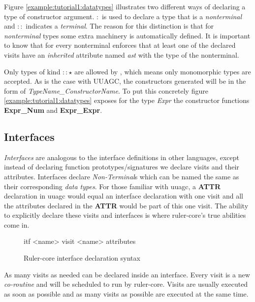 Figure \ref{example:tutorial1:datatypes} illustrates two different ways of declaring a type of constructor argument. $:$ is used to declare a type that is a \emph{nonterminal} and $::$ indicates a \emph{terminal}. The reason for this distinction is that for \emph{nonterminal} types some extra machinery is automatically defined. It is important to know that for every nonterminal \rcore enforces that at least one of the declared visits have an \emph{inherited} attribute named \emph{ast} with the type of the nonterminal.

Only types of kind $:: \star$ are allowed by \rcore, which means only monomorphic types are accepted. As is the case with UUAGC, the constructors generated will be in the form of \emph{TypeName\_ConstructorName}. To put this concretely figure \ref{example:tutorial1:datatypes} exposes for the type \emph{Expr} the constructor functions \textbf{Expr\_Num} and \textbf{Expr\_Expr}.

\subsection{Interfaces}
\emph{Interfaces} are analogous to the interface definitions in other languages, except instead of declaring function prototypes/signatures we declare visits and their attributes. Interfaces declare \emph{Non-Terminal}s which can be named the same as their corresponding \emph{data types}. For those familiar with uuagc, a \textbf{ATTR} declaration in uuagc would equal an interface declaration with one visit and all the attributes declared in the \textbf{ATTR} would be part of this one visit. The ability to explicitly declare these visits and interfaces is where ruler-core's true abilities come in.

\begin{figure}[h!]
\begin{code}
itf <name>
  {visit <name>
    {attributes}
  }
\end{code}
\caption{Ruler-core interface declaration syntax}
\label{itf:syntax}
\end{figure}

As many visits as needed can be declared inside an interface. Every visit is a new \emph{co-routine} and will be scheduled to run by ruler-core. Visits are usually executed as soon as possible and as many visits as possible are executed at the same time. %

